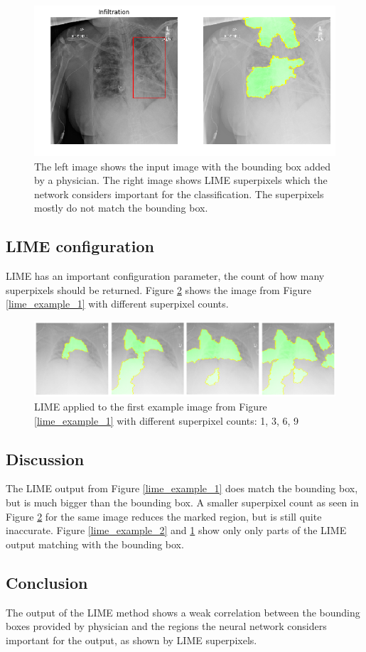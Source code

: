 \begin{figure}[H]
\centering
\includegraphics[width=12cm]{chapters/03_classification/images/lime_8.png}
\caption{The left image shows the input image with the bounding box added by a physician. The right image shows LIME superpixels which the network considers important for the classification. The superpixels mostly do not match the bounding box.}
\label{lime_example_3}
\end{figure}

\subsection{LIME configuration}
LIME has an important configuration parameter, the count of how many superpixels should be returned. Figure \ref{lime_superpixel_count} shows the image from Figure \ref{lime_example_1} with different superpixel counts.

\begin{figure}[H]
\centering
\includegraphics[width=14cm]{chapters/03_classification/images/lime-superpixel.png}
\caption{LIME applied to the first example image from Figure \ref{lime_example_1} with different superpixel counts: 1, 3, 6, 9}
\label{lime_superpixel_count}
\end{figure}

\subsection{Discussion}
The LIME output from Figure \ref{lime_example_1} does match the bounding box, but is much bigger than the bounding box. A smaller superpixel count as seen in Figure \ref{lime_superpixel_count} for the same image reduces the marked region, but is still quite inaccurate. Figure \ref{lime_example_2} and \ref{lime_example_3} show only only parts of the LIME output matching with the bounding box.

\subsection{Conclusion}
The output of the LIME method shows a weak correlation between the bounding boxes provided by physician and the regions the neural network considers important for the output, as shown by LIME superpixels.
